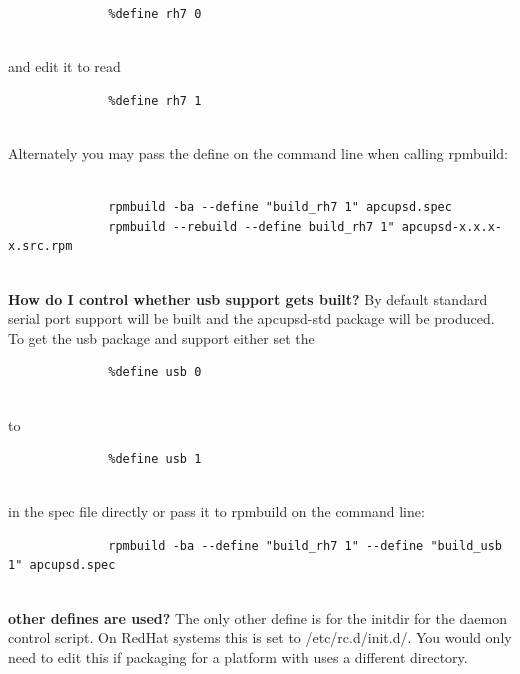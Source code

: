 {{{{{{{{{{{{{{{{{\begin{description}
\footnotesize
\begin{verbatim}
              %define rh7 0
     
\end{verbatim}
\normalsize

and edit it to read  

\footnotesize
\begin{verbatim}
              %define rh7 1
     
\end{verbatim}
\normalsize

Alternately you may pass the define on the command line when calling rpmbuild:
 

\footnotesize
\begin{verbatim}
          
              rpmbuild -ba --define "build_rh7 1" apcupsd.spec
              rpmbuild --rebuild --define build_rh7 1" apcupsd-x.x.x-x.src.rpm
     
\end{verbatim}
\normalsize


\item {\bf {\bf How do I control whether usb support gets built?}}
By default standard serial port support will be built and the apcupsd-std
package will be produced. To get the usb package and support either set the  

\footnotesize
\begin{verbatim}
              %define usb 0
     
\end{verbatim}
\normalsize

to  

\footnotesize
\begin{verbatim}
              %define usb 1
     
\end{verbatim}
\normalsize

in the spec file directly or pass it to rpmbuild on the command line:  

\footnotesize
\begin{verbatim}
              rpmbuild -ba --define "build_rh7 1" --define "build_usb 1" apcupsd.spec
     
\end{verbatim}
\normalsize


\item {\bf {\bf other defines are used?}}
The only other define is for the initdir for the daemon control script. On
RedHat systems this is set to /etc/rc.d/init.d/.  You would only need to edit
this if packaging for a platform with uses a different directory.  


\end{description}}}}}}}}}}}}}}}}}}
